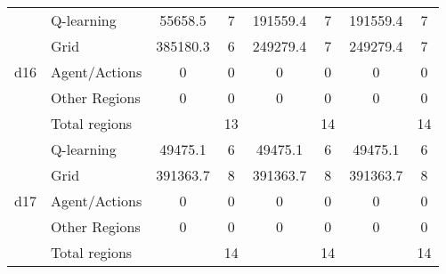 \begin{tabular}{ c l | cc | cc | cc }
\midrule
%
%
%
\multirow{5}{*}{d16} & Q-learning 	& 55658.5&7 	&191559.4&7 	&191559.4&7\\
& Grid 					& 385180.3&6 	&249279.4&7 	&249279.4&7 \\
& Agent/Actions 				& 0&0 		&0&0 			&0&0\\
& Other Regions	 			& 0&0 		&0&0 			&0&0\\
& Total regions 				& &13 		&&14 			&&14\\

\midrule
\multirow{5}{*}{d17} & Q-learning 	& 49475.1&6 	&49475.1&6 		&49475.1&6\\
& Grid 					& 391363.7&8 	&391363.7&8 	&391363.7&8 \\
& Agent/Actions 				& 0&0 		&0&0 			&0&0\\
& Other Regions	 			& 0&0 		&0&0 			&0&0\\
& Total regions 				& &14 		&&14 			&&14\\


\end{tabular}

